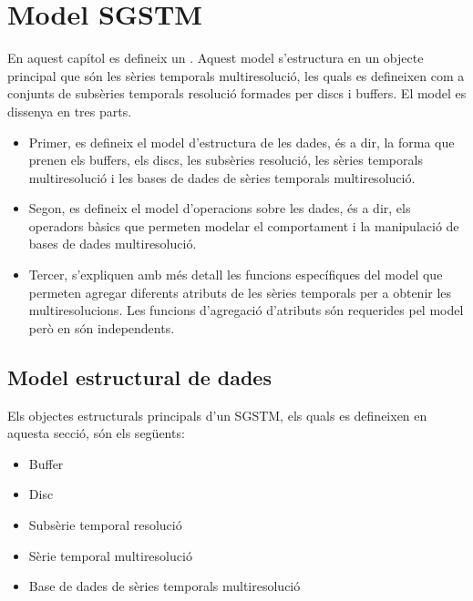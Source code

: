\chapter{Model SGSTM}
\label{cap:model:sgstm}

En aquest capítol es defineix un . Aquest model s'estructura en un objecte
principal que són les sèries temporals multiresolució, les quals es
defineixen com a conjunts de subsèries temporals resolució formades
per discs i buffers. El model es dissenya en tres parts.

\begin{itemize}
\item Primer, es defineix el model d'estructura de les dades, és a
  dir, la forma que prenen els buffers, els discs, les subsèries
  resolució, les sèries temporals multiresolució i les bases de dades
  de sèries temporals multiresolució.

\item Segon, es defineix el model d'operacions sobre les dades, és a
  dir, els operadors bàsics que permeten modelar el comportament i la
  manipulació de bases de dades multiresolució.

\item Tercer, s'expliquen amb més detall les funcions específiques del
  model que permeten agregar diferents atributs de les sèries
  temporals per a obtenir les multiresolucions. Les funcions
  d'agregació d'atributs són requerides pel model però en són
  independents.
\end{itemize}




\section{Model estructural de dades}

Els objectes estructurals principals d'un SGSTM, els quals es
defineixen en aquesta secció, són els següents:
\begin{itemize}
\item Buffer
\item Disc
\item Subsèrie temporal resolució
\item Sèrie temporal multiresolució
\item Base de dades de sèries temporals multiresolució
\end{itemize}

